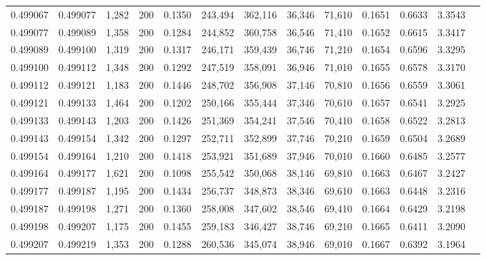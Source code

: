 \begin{tabular}{rrrrrrrrrrrrr}
0.499067 & 0.499077 & 1,282 & 200 &                                     0.1350 & 243,494 & 362,116 &  36,346 &  71,610 & 0.1651 & 0.6633 & 3.3543 \\
0.499077 & 0.499089 & 1,358 & 200 &                                     0.1284 & 244,852 & 360,758 &  36,546 &  71,410 & 0.1652 & 0.6615 & 3.3417 \\
0.499089 & 0.499100 & 1,319 & 200 &                                     0.1317 & 246,171 & 359,439 &  36,746 &  71,210 & 0.1654 & 0.6596 & 3.3295 \\
0.499100 & 0.499112 & 1,348 & 200 &                                     0.1292 & 247,519 & 358,091 &  36,946 &  71,010 & 0.1655 & 0.6578 & 3.3170 \\
0.499112 & 0.499121 & 1,183 & 200 &                                     0.1446 & 248,702 & 356,908 &  37,146 &  70,810 & 0.1656 & 0.6559 & 3.3061 \\
0.499121 & 0.499133 & 1,464 & 200 &                                     0.1202 & 250,166 & 355,444 &  37,346 &  70,610 & 0.1657 & 0.6541 & 3.2925 \\
0.499133 & 0.499143 & 1,203 & 200 &                                     0.1426 & 251,369 & 354,241 &  37,546 &  70,410 & 0.1658 & 0.6522 & 3.2813 \\
0.499143 & 0.499154 & 1,342 & 200 &                                     0.1297 & 252,711 & 352,899 &  37,746 &  70,210 & 0.1659 & 0.6504 & 3.2689 \\
0.499154 & 0.499164 & 1,210 & 200 &                                     0.1418 & 253,921 & 351,689 &  37,946 &  70,010 & 0.1660 & 0.6485 & 3.2577 \\
0.499164 & 0.499177 & 1,621 & 200 &                                     0.1098 & 255,542 & 350,068 &  38,146 &  69,810 & 0.1663 & 0.6467 & 3.2427 \\
0.499177 & 0.499187 & 1,195 & 200 &                                     0.1434 & 256,737 & 348,873 &  38,346 &  69,610 & 0.1663 & 0.6448 & 3.2316 \\
0.499187 & 0.499198 & 1,271 & 200 &                                     0.1360 & 258,008 & 347,602 &  38,546 &  69,410 & 0.1664 & 0.6429 & 3.2198 \\
0.499198 & 0.499207 & 1,175 & 200 &                                     0.1455 & 259,183 & 346,427 &  38,746 &  69,210 & 0.1665 & 0.6411 & 3.2090 \\
0.499207 & 0.499219 & 1,353 & 200 &                                     0.1288 & 260,536 & 345,074 &  38,946 &  69,010 & 0.1667 & 0.6392 & 3.1964 \\

\end{tabular}
